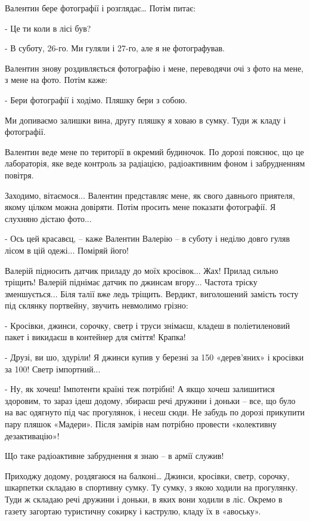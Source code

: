 Валентин бере фотографії і розглядає… Потім питає: 

- Це ти коли в лісі був?

- В суботу, 26-го. Ми гуляли і 27-го, але я не фотографував.

Валентин знову роздивляється фотографію і мене, переводячи очі з фото на мене,
з мене на фото. Потім каже:

- Бери фотографії і ходімо. Пляшку бери з собою.

Ми допиваємо залишки вина, другу пляшку я ховаю в сумку. Туди ж кладу і
фотографії. 

Валентин веде мене по території в окремий будиночок. По дорозі пояснює, що це
лабораторія, яке веде контроль за радіацією, радіоактивним фоном і забрудненням
повітря. 

Заходимо, вітаємося... Валентин представляє мене, як свого давнього приятеля,
якому цілком можна довіряти. Потім просить мене показати фотографії. Я слухняно
дістаю фото... 

- Ось цей красавєц, – каже Валентин Валерію – в суботу і неділю довго гуляв
лісом в цій одежі... Поміряй його!

Валерій підносить датчик приладу до моїх кросівок... Жах! Прилад сильно тріщить!
Валерій піднімає датчик по джинсам вгору... Частота тріску зменшується... Біля
талії вже ледь тріщить. Вердикт, виголошений замість тосту під склянку
портвейну, звучить невмолимо грізно:

- Кросівки, джинси, сорочку, светр і труси знімаєш, кладеш в поліетиленовий
пакет і викидаєш в контейнер для сміття! Крапка!

- Друзі, ви шо, здуріли! Я джинси купив у березні за 150 «дерев’яних» і
кросівки за 100! Светр імпортний... 

- Ну, як хочеш! Імпотенти країні теж потрібні! А якщо хочеш залишитися
здоровим, то зараз ідеш додому, збираєш речі дружини і доньки – все, що було на
вас одягнуто під час прогулянок, і несеш сюди. Не забудь по дорозі прикупити
пару пляшок «Мадери». Після замірів нам потрібно провести «колективну
дезактивацію»!

Що таке радіоактивне забруднення я знаю – в армії служив!

Приходжу додому, роздягаюся на балконі… Джинси, кросівки, светр, сорочку,
шкарпетки складаю в спортивну сумку. Ту сумку, з якою ходили на прогулянку.
Туди ж складаю речі дружини і доньки, в яких вони ходили в ліс. Окремо в газету
загортаю туристичну сокирку і каструлю, кладу їх в «авоську». 


